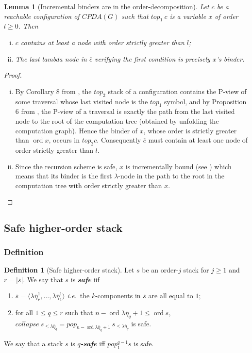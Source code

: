 \documentclass{article}
\newcommand{\ord}{\mathop{\mathrm{ord}}}
\newcommand{\prefixof}{\leqslant}
\newcommand\defname[1]{{\bf\em #1}\index{#1}}
\newtheorem{lemma}{Lemma}[section]
\theoremstyle{remark}
\theoremstyle{definition}
\newtheorem{definition}{Definition}[section]
\newcommand\orddec\overline
\def\ie{{\it i.e.}\ }
\begin{document}
\begin{lemma}[Incremental binders are in the order-decomposition]
\label{lem:binder_in_ordecompos} Let $c$ be a reachable
configuration of $CPDA(G)$ such that $top_1\
c$ is a variable $x$ of order $l\geq 0$. Then
\begin{enumerate}[i.]
\item $\orddec{c}$ contains at least a node with order strictly
greater than $l$;
\item The last lambda node in $\orddec{c}$ verifying the first condition is precisely $x$'s binder.
\end{enumerate}
\end{lemma}
\begin{proof}
\begin{enumerate}[i.]
\item By Corollary 8 from \cite{hague-sto07}, the $top_2$
     stack of a configuration contains the P-view of some
    traversal whose last visited node is the $top_1$ symbol, and
    by Proposition 6 from \cite{OngLics2006}, the P-view of a
    traversal is exactly the path from the last visited node to
    the root of the computation tree (obtained by unfolding the
    computation graph). Hence the binder of $x$, whose order
    is strictly greater than $\ord{x}$, occurs in $top_2 c$.
    Consequently $\orddec{c}$ must contain at least one node of order strictly greater than $l$.

\item Since the recursion scheme is safe, $x$ is
 incrementally bound (see \cite{blumong:safelambdacalculus})
 which means that its binder is the first $\lambda$-node in the
 path to the root in the computation tree with order strictly
 greater than $x$.
\end{enumerate}
\end{proof}

\subsection{Safe higher-order stack}
\subsubsection{Definition}

\begin{definition}[Safe higher-order stack]
\label{dfn:safestack} Let $s$ be an order-$j$ stack for $j\geq1$ and $r
= |\orddec{s}|$.
We say that $s$ is \defname{safe} iif
    \begin{enumerate}[1.]
    \item $\orddec{s} = \langle \lambda \overline{\eta}_r^1, \ldots ,
    \lambda \overline{\eta}_1^1 \rangle$ \ie the $k$-components in $\orddec{s}$ are all equal to $1$;
    \item for all $1 \leq q \leq r$ such that $n-\ord{\lambda \overline{\eta}_q}+1 \leq \ord{s}$, 
    $collapse~s_{\prefixof \lambda \overline{\eta}_q} = pop_{n-\ord{\lambda \overline{\eta}_q}+1}~s_{\prefixof \lambda \overline{\eta}_q}$ is safe.
    \end{enumerate}
We say that a stack $s$ is \defname{$q$-safe} iff $pop_1^{q-1} s$ is safe.
\end{definition}
\end{document}
